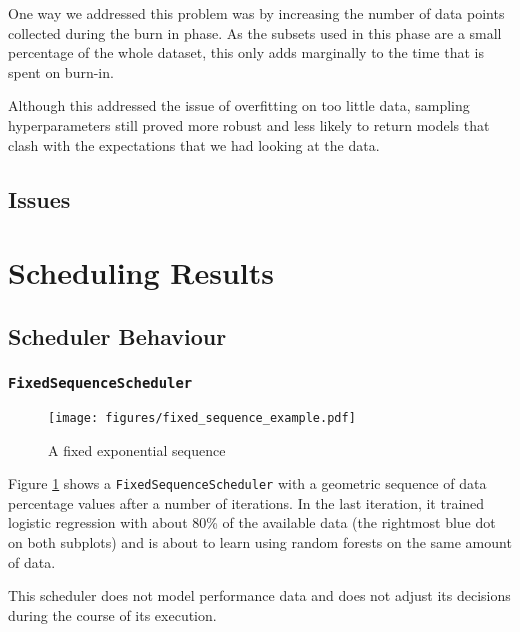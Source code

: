 \documentclass[a4paper,12pt,twoside,openright]{report}
\begin{document}
One way we addressed this problem was by increasing the number of data points collected during the burn in phase. As the subsets used in this phase are a small percentage of the whole dataset, this only adds marginally to the time that is spent on burn-in.

Although this addressed the issue of overfitting on too little data, sampling hyperparameters still proved more robust and less likely to return models that clash with the expectations that we had looking at the data.


\subsection{Issues}


\section{Scheduling Results}


\subsection{Scheduler Behaviour}


\subsubsection{\texttt{FixedSequenceScheduler}}
\begin{figure}
\centering
  \texttt{[image: figures/fixed\_sequence\_example.pdf]}
  \caption{A fixed exponential sequence}
  \label{fixedsequenceexample}
\end{figure}

Figure \ref{fixedsequenceexample} shows a \texttt{FixedSequenceScheduler} with a geometric sequence of data percentage values after a number of iterations. In the last iteration, it trained logistic regression with about 80\% of the available data (the rightmost blue dot on both subplots) and is about to learn using random forests on the same amount of data.

This scheduler does not model performance data and does not adjust its decisions during the course of its execution.
\end{document}
